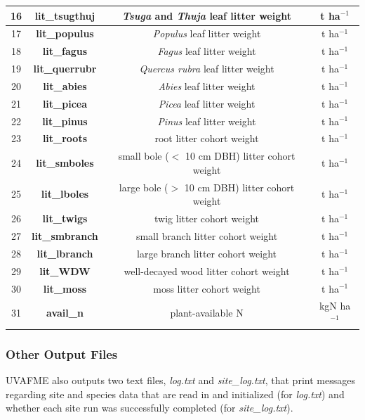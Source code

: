 \documentclass[a4paper, 12pt] {article}
\begin{document}
\begin{table} [H]
{\begin{tabular}{|c|c|c|c|}
16 & \textbf{lit\_tsugthuj} & \textit{Tsuga} and  \textit{Thuja} leaf litter weight& t ha$^{-1}$  \\
\hline 
17 & \textbf{lit\_populus} & \textit{Populus} leaf litter weight & t ha$^{-1}$  \\
\hline 
18 & \textbf{lit\_fagus} & \textit{Fagus} leaf litter weight & t ha$^{-1}$  \\
\hline 
19 & \textbf{lit\_querrubr} & \textit{Quercus rubra} leaf litter weight& t ha$^{-1}$  \\
\hline 
20 & \textbf{lit\_abies} &\textit{Abies} leaf litter weight & t ha$^{-1}$  \\
\hline 
21 & \textbf{lit\_picea} & \textit{Picea} leaf litter weight & t ha$^{-1}$  \\
\hline 
22 & \textbf{lit\_pinus} & \textit{Pinus} leaf litter weight & t ha$^{-1}$  \\
\hline 
23 & \textbf{lit\_roots} & root litter cohort weight & t ha$^{-1}$  \\
\hline 
24 & \textbf{lit\_smboles} & small bole ($<$ 10 cm DBH) litter cohort weight  & t ha$^{-1}$  \\
\hline 
25 & \textbf{lit\_lboles} & large bole ($>$ 10 cm DBH)  litter cohort weight & t ha$^{-1}$  \\
\hline 
26 & \textbf{lit\_twigs} & twig litter cohort weight  & t ha$^{-1}$  \\
\hline 
27 & \textbf{lit\_smbranch} & small branch litter cohort weight  & t ha$^{-1}$  \\
\hline 
28 & \textbf{lit\_lbranch} & large branch litter cohort weight  & t ha$^{-1}$  \\
\hline 
29 & \textbf{lit\_WDW} & well-decayed wood litter cohort weight  & t ha$^{-1}$ \\
\hline 
30 & \textbf{lit\_moss} & moss litter cohort weight  & t ha$^{-1}$ \\
\hline 
31 & \textbf{avail\_n} & plant-available N & kgN ha$^{-1}$ \\
\hline 
\end{tabular}}
\end{table}

\subsubsection{Other Output Files}

UVAFME also outputs two text files, \textit{log.txt} and \textit{site\_log.txt}, that print messages regarding site and species data that are read in and initialized (for \textit{log.txt}) and whether each site run was successfully completed (for \textit{site\_log.txt}).  
\end{document}
